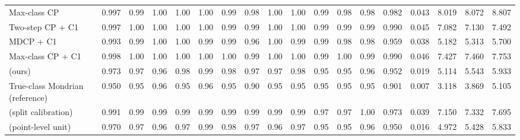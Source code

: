 \begin{table}[!htbp]
{\begin{tabular}{lccccccccccccccccc}
Max-class CP & 0.997 & 0.99 & 1.00 & 1.00 & 1.00 & 0.99 & 0.98 & 1.00 & 1.00 & 0.99 & 0.98 & 0.98 & 0.982 & 0.043 & 8.019 & 8.072 & 8.807 \\
Two-step CP + C1 & 0.997 & 1.00 & 1.00 & 1.00 & 1.00 & 0.99 & 0.99 & 1.00 & 1.00 & 0.99 & 0.99 & 0.99 & 0.990 & 0.045 & 7.082 & 7.130 & 7.492 \\
MDCP + C1 & 0.993 & 0.99 & 1.00 & 1.00 & 0.99 & 0.99 & 0.96 & 1.00 & 0.99 & 0.99 & 0.98 & 0.98 & 0.959 & 0.038 & 5.182 & 5.313 & 5.700 \\
Max-class CP + C1 & 0.998 & 1.00 & 1.00 & 1.00 & 1.00 & 1.00 & 0.99 & 1.00 & 1.00 & 0.99 & 1.00 & 0.99 & 0.990 & 0.046 & 7.427 & 7.460 & 7.753 \\
\gamut{} (ours) & 0.973 & 0.97 & 0.96 & 0.98 & 0.99 & 0.98 & 0.97 & 0.97 & 0.98 & 0.95 & 0.95 & 0.96 & 0.952 & 0.019 & 5.114 & 5.543 & 5.933 \\
True-class Mondrian (reference) & 0.950 & 0.95 & 0.96 & 0.95 & 0.96 & 0.95 & 0.90 & 0.95 & 0.95 & 0.95 & 0.95 & 0.95 & 0.901 & 0.007 & 3.118 & 3.869 & 5.105 \\
\gamut{} (split calibration) & 0.991 & 0.99 & 0.99 & 0.99 & 0.99 & 0.99 & 0.99 & 0.99 & 0.99 & 0.97 & 0.97 & 1.00 & 0.973 & 0.039 & 7.150 & 7.332 & 7.695 \\
\gamut{} (point-level unit) & 0.970 & 0.97 & 0.96 & 0.97 & 0.99 & 0.98 & 0.97 & 0.96 & 0.97 & 0.95 & 0.95 & 0.96 & 0.950 & 0.016 & 4.972 & 5.428 & 5.833 \\
\bottomrule
\end{tabular}}
\end{table}

